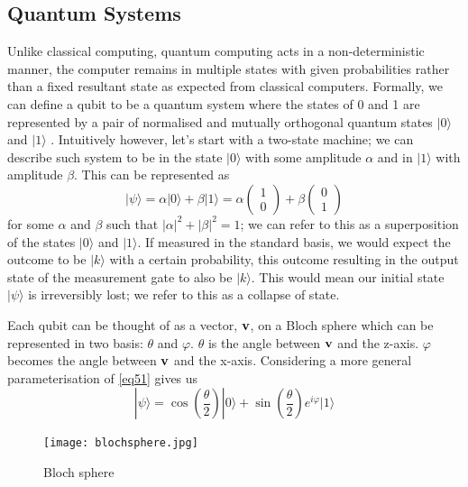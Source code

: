 \documentclass[12pt]{article}
\newcommand{\newp}
    {
    \vskip 0.5cm 
  }
\numberwithin{equation}{section}
\begin{document}
\subsection{Quantum Systems}
Unlike classical computing, quantum computing acts in a non-deterministic manner,
the computer remains in multiple states with given probabilities rather than a
fixed resultant state as expected from classical computers. Formally, we can define 
a qubit to be a quantum system where the states of 0 and 1 are represented by a pair 
of normalised and mutually orthogonal quantum states $|0\rangle$ and $|1\rangle$ \autocite{mac,nielsen_2010_quantum,hidary_2021_quantum}. 
Intuitively however, let's start with a two-state machine; 
we can describe such system to be in the state 
$|0\rangle$ with some amplitude $\alpha$ and in $|1\rangle$ with amplitude $\beta$. 
This can be represented  as
\begin{equation}\label{eq51}
  |\psi\rangle = \alpha|0\rangle + \beta|1\rangle = \alpha\begin{pmatrix} 
    1\\0\end{pmatrix} + \beta\begin{pmatrix}0\\1\end{pmatrix}
\end{equation}
for 
some $\alpha$ and $\beta$ such that $|\alpha|^2+|\beta|^2 = 1$; 
we can refer to this as a superposition of the states $|0\rangle$ and $|1\rangle$. 
If measured in the standard basis, we would expect the outcome to be $|k\rangle$ 
with a certain probability, this outcome resulting in the output state of the 
measurement gate to also be $|k\rangle$. This would mean our initial state $|\psi\rangle$
is irreversibly lost; we refer to this as a collapse of state\autocite{mac}.
\newp 
Each qubit can 
be thought of as a vector, $\bold{v}$, on a Bloch sphere which can be represented in two 
basis: $\theta$ and $\varphi$. $\theta$ is the angle between $\bold{v}$ and the 
z-axis. $\varphi$ becomes the angle between $\bold{v}$ and the x-axis. Considering 
a more general parameterisation of 
\ref{eq51} gives us 
\begin{equation}\label{hilbert1}
  |\psi\rangle = \cos (\frac{\theta}{2})|0\rangle + \sin(\frac{\theta}
  {2})e^{i\varphi}|1\rangle
\end{equation}
\begin{figure}[h!]
  \centering 
  \texttt{[image: blochsphere.jpg]}
  \caption{Bloch sphere \autocite{packt}}
  \label{fig:bloch}
\end{figure}
\newp 
\end{document}
